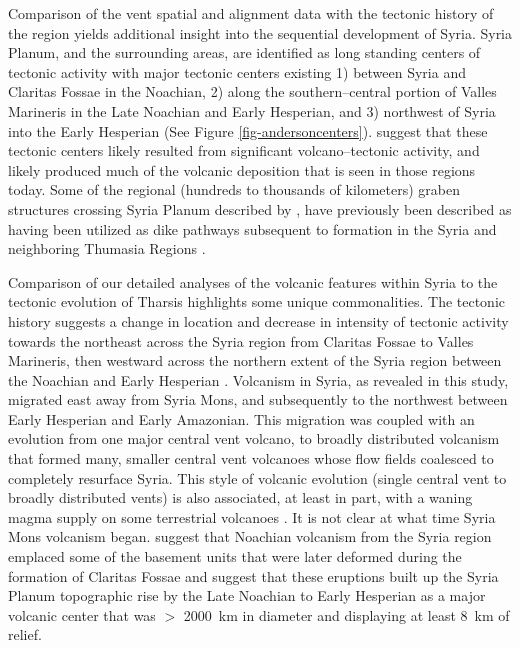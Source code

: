 Comparison of the vent spatial and alignment data with the tectonic history of the region yields additional insight into the sequential development of Syria. Syria Planum, and the surrounding areas, are identified as long standing centers of tectonic activity with major tectonic centers existing 1) between Syria and Claritas Fossae in the Noachian, 2) along the southern--central portion of Valles Marineris in the Late Noachian and Early Hesperian, and 3) northwest of Syria into the Early Hesperian \citep{Dohm1999,Anderson2001,Anderson2004} (See Figure \ref{fig-andersoncenters}).  \citet{Dohm1999} suggest that these tectonic centers likely resulted from significant volcano--tectonic activity, and likely produced much of the volcanic deposition that is seen in those regions today. Some of the regional (hundreds to thousands of kilometers) graben structures crossing Syria Planum described by \citet{Dohm1999}, have previously been described as having been utilized as dike pathways subsequent to formation in the Syria and neighboring Thumasia Regions \citep{Plescia1982,Mege1996,Wilson2002}.

Comparison of our detailed analyses of the volcanic features within Syria to the tectonic evolution of Tharsis highlights some unique commonalities.  The tectonic history suggests a change in location and decrease in intensity of tectonic activity towards the northeast across the Syria region from Claritas Fossae to Valles Marineris, then westward across the northern extent of the Syria region between the Noachian and Early Hesperian \citep{Dohm1999,Anderson2002,Anderson2004}.  Volcanism in Syria, as revealed in this study, migrated east away from Syria Mons, and subsequently to the northwest between Early Hesperian and Early Amazonian. This migration was coupled with an evolution from one major central vent volcano, to broadly distributed volcanism that formed many, smaller central vent volcanoes whose flow fields coalesced to completely resurface Syria.  This style of volcanic evolution (single central vent to broadly distributed vents) is also associated, at least in part, with a waning magma supply on some terrestrial volcanoes \citep{Moore2007,Wolfe1996,Rowland2000,Bleacher2008}.  It is not clear at what time Syria Mons volcanism began.  \citet{Dohm1999} suggest that Noachian volcanism from the Syria region emplaced some of the basement units that were later deformed during the formation of Claritas Fossae and \citet{Webb2001} suggest that these eruptions built up the Syria Planum topographic rise by the Late Noachian to Early Hesperian as a major volcanic center that was $>$ 2000~km in diameter and displaying at least 8~km of relief.

